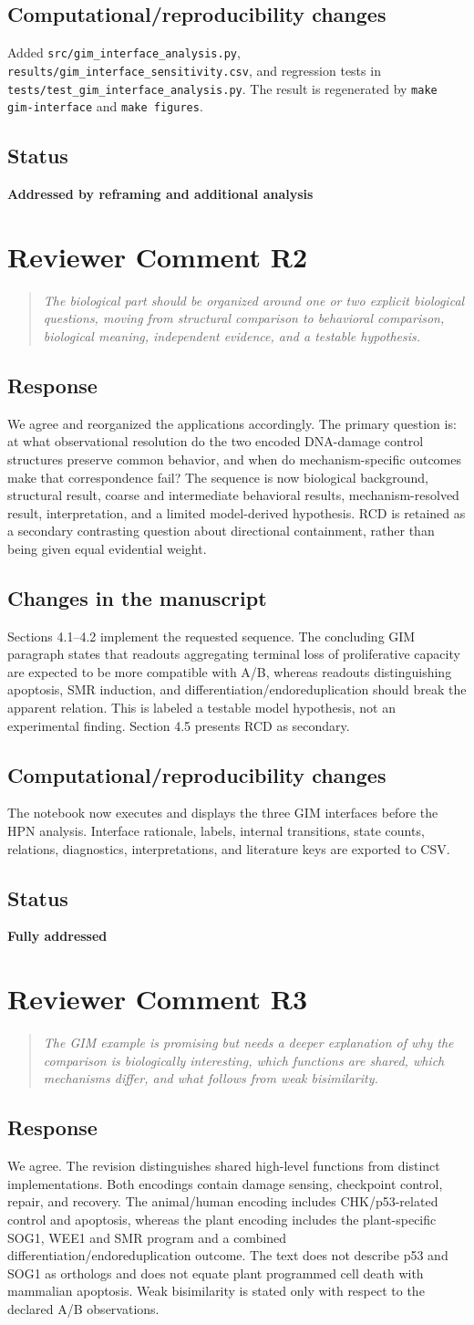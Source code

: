 \documentclass[11pt]{article}
\newcommand{\reviewcomment}[2]{%
  \section*{Reviewer Comment #1}
  \begin{quote}\itshape #2\end{quote}}
\newcommand{\response}{\subsection*{Response}}
\newcommand{\manuscriptchanges}{\subsection*{Changes in the manuscript}}
\newcommand{\computationalchanges}{\subsection*{Computational/reproducibility changes}}
\newcommand{\status}[1]{\subsection*{Status}\textbf{#1}}
\begin{document}
\computationalchanges
Added \nolinkurl{src/gim_interface_analysis.py},
\nolinkurl{results/gim_interface_sensitivity.csv}, and regression tests in
\nolinkurl{tests/test_gim_interface_analysis.py}. The result is regenerated by
\texttt{make gim-interface} and \texttt{make figures}.

\status{Addressed by reframing and additional analysis}

\reviewcomment{R2}{The biological part should be organized around one or two
explicit biological questions, moving from structural comparison to behavioral
comparison, biological meaning, independent evidence, and a testable
hypothesis.}

\response
We agree and reorganized the applications accordingly. The primary question is:
at what observational resolution do the two encoded DNA-damage control
structures preserve common behavior, and when do mechanism-specific outcomes
make that correspondence fail? The sequence is now biological background,
structural result, coarse and intermediate behavioral results, mechanism-resolved
result, interpretation, and a limited model-derived hypothesis. RCD is retained
as a secondary contrasting question about directional containment, rather than
being given equal evidential weight.

\manuscriptchanges
Sections 4.1--4.2 implement the requested sequence. The concluding GIM paragraph
states that readouts aggregating terminal loss of proliferative capacity are
expected to be more compatible with A/B, whereas readouts distinguishing
apoptosis, SMR induction, and differentiation/endoreduplication should break the
apparent relation. This is labeled a testable model hypothesis, not an
experimental finding. Section 4.5 presents RCD as secondary.

\computationalchanges
The notebook now executes and displays the three GIM interfaces before the HPN
analysis. Interface rationale, labels, internal transitions, state counts,
relations, diagnostics, interpretations, and literature keys are exported to
CSV.

\status{Fully addressed}

\reviewcomment{R3}{The GIM example is promising but needs a deeper explanation
of why the comparison is biologically interesting, which functions are shared,
which mechanisms differ, and what follows from weak bisimilarity.}

\response
We agree. The revision distinguishes shared high-level functions from distinct
implementations. Both encodings contain damage sensing, checkpoint control,
repair, and recovery. The animal/human encoding includes CHK/p53-related control
and apoptosis, whereas the plant encoding includes the plant-specific SOG1,
WEE1 and SMR program and a combined differentiation/endoreduplication outcome.
The text does not describe p53 and SOG1 as orthologs and does not equate plant
programmed cell death with mammalian apoptosis. Weak bisimilarity is stated only
with respect to the declared A/B observations.
\end{document}
